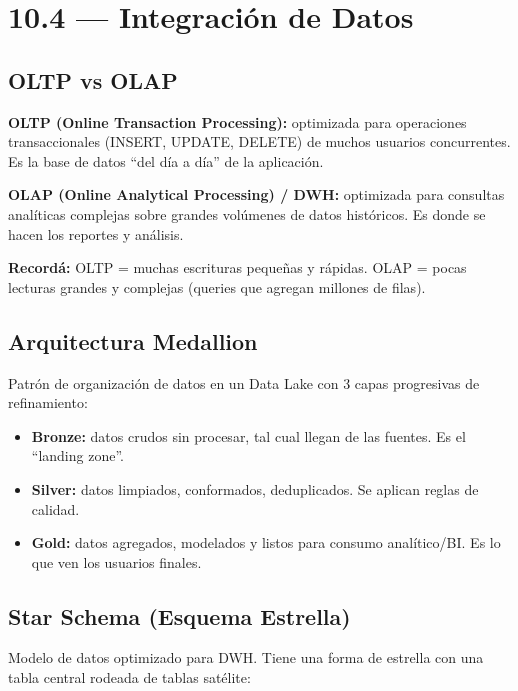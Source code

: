 \documentclass[11pt, a4paper]{article}
\begin{document}
\section{10.4 — Integración de Datos}

\subsection{OLTP vs OLAP}

\textbf{OLTP (Online Transaction Processing):} optimizada para operaciones transaccionales (INSERT, UPDATE, DELETE) de muchos usuarios concurrentes. Es la base de datos ``del día a día'' de la aplicación.

\textbf{OLAP (Online Analytical Processing) / DWH:} optimizada para consultas analíticas complejas sobre grandes volúmenes de datos históricos. Es donde se hacen los reportes y análisis.

\begin{recallbox}
	\textbf{Recordá:} OLTP = muchas escrituras pequeñas y rápidas. OLAP = pocas lecturas grandes y complejas (queries que agregan millones de filas).
\end{recallbox}

\subsection{Arquitectura Medallion}

Patrón de organización de datos en un Data Lake con 3 capas progresivas de refinamiento:
\begin{itemize}
	\item \textbf{Bronze:} datos crudos sin procesar, tal cual llegan de las fuentes. Es el ``landing zone''.
	\item \textbf{Silver:} datos limpiados, conformados, deduplicados. Se aplican reglas de calidad.
	\item \textbf{Gold:} datos agregados, modelados y listos para consumo analítico/BI. Es lo que ven los usuarios finales.
\end{itemize}

\subsection{Star Schema (Esquema Estrella)}

Modelo de datos optimizado para DWH. Tiene una forma de estrella con una tabla central rodeada de tablas satélite:
\end{document}

